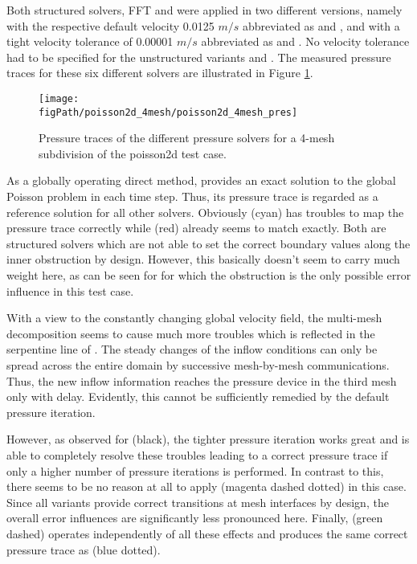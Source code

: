 Both structured solvers, FFT and \scarc{} were applied in two different versions, namely with the respective default velocity 0.0125 $m/s$ abbreviated as \fftdefault{} and \scarcdefault{}, and with a tight velocity tolerance of 0.00001 $m/s$ abbreviated as \ffttight{} and \scarctight{}.
No velocity tolerance had to be specified for the unstructured variants \uglmat{} and \uscarc{}. 
The measured pressure traces for these six different solvers are illustrated in Figure \ref{FIG_SCARC_poisson_four_trace}.

\begin{figure}[h]
\begin{center}
\texttt{[image: \\figPath/poisson2d\_4mesh/poisson2d\_4mesh\_pres]}
\end{center}
\caption[Pressure traces of the different pressure solvers for {\ct poisson2d} with 4 meshes]{Pressure traces of the different pressure solvers for a 4-mesh subdivision of the {\ct poisson2d} test case. }
\label{FIG_SCARC_poisson_four_trace}
\end{figure}

\newpage
As a globally operating direct method, \uglmat{} provides an exact solution to the global Poisson problem in each time step. Thus, its pressure trace is regarded as a reference solution for all other solvers.
%
Obviously \fftdefault{} (cyan) has troubles to map the pressure trace correctly while \scarcdefault{} (red) 
already seems to match exactly. Both are structured solvers which are not able to set the correct boundary values along the inner obstruction by design. However, this basically doesn't seem to carry much weight here, as can be seen for \scarcdefault{} for which the obstruction is the only possible error influence in this test case.

With a view to the constantly changing global velocity field, the multi-mesh decomposition seems to cause much more troubles 
which is reflected in the serpentine line of \fftdefault{}. The steady changes of the inflow conditions can only be spread across the entire domain by successive mesh-by-mesh communications. Thus, the new inflow information reaches the pressure device in the third mesh only with delay. Evidently, this cannot be sufficiently remedied by the default pressure iteration.

However, as observed for \ffttight{} (black), the tighter pressure iteration works great and is able to completely resolve these troubles leading to a correct pressure trace if only a higher number of pressure iterations is performed.
In contrast to this, there seems to be no reason at all to apply \scarctight{} (magenta dashed dotted) in this case. Since all \scarc{} variants provide correct transitions at mesh interfaces by design, the overall error influences are significantly less pronounced here.
Finally, \uscarc{} (green dashed) operates independently of all these effects and produces the same correct pressure trace as \uglmat{} (blue dotted).

